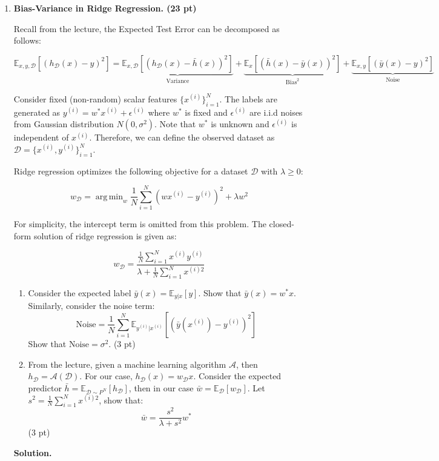 \documentclass{article}
\DeclareMathOperator*{\argmin}{arg\,min}
\theoremstyle{definition}
\theoremstyle{remark}
\newenvironment{Q}
    {%
      \clearpage
      \item
    }
    {%
      \phantom{s}
      \bigskip
      \textbf{Solution.}
    }
\begin{document}
\begin{enumerate}[font={\Large\bfseries},left=0pt]


\begin{Q}

\textbf{\Large Bias-Variance in Ridge Regression. (23 pt)}

Recall from the lecture, the Expected Test Error can be decomposed as follows:

$$
\mathbb{E}_{x, y, \mathcal{D}}[(h_{\mathcal{D}}(x) - y )^2] = \underbrace{\mathbb{E}_{x, \mathcal{D}}[(h_{\mathcal{D}}(x) - \bar{h}(x))^2]}_{\text{Variance}} + \underbrace{\mathbb{E}_{x}[(\bar{h}(x)-\bar{y}(x))^2]}_{\text{Bias}^2} + \underbrace{\mathbb{E}_{x, y}[(\bar{y}(x)-y)^2]}_{\text{Noise}}
$$

Consider fixed (non-random) scalar features $\{x^{(i)}\}_{i=1}^N$. The labels are generated as $y^{(i)}=w^* x^{(i)}+\epsilon^{(i)}$ where $w^{*}$ is fixed and $\epsilon^{(i)}$ are i.i.d noises from Gaussian distribution $N(0,\sigma^2)$. Note that $w^{*}$ is unknown and $\epsilon^{(i)}$ is independent of $x^{(i)}$. Therefore, we can define the observed dataset as $\mathcal{D} = \{x^{(i)}, y^{(i)}\}_{i=1}^N$.  

Ridge regression optimizes the following objective for a dataset $\mathcal{D}$ with $\lambda \geq 0$:

$$
w_{\mathcal{D}} = \argmin_w \frac{1}{N} \sum_{i=1}^N (wx^{(i)}-y^{(i)})^2 + \lambda w^2
$$

For simplicity, the intercept term is omitted from this problem. The closed-form solution of ridge regression is given as:

$$
w_{\mathcal{D}} = \frac{\frac{1}{N}\sum_{i=1}^N x^{(i)} y^{(i)}}{\lambda + \frac{1}{N} \sum_{i=1}^N x^{(i)2}}
$$

\begin{enumerate}
    \item Consider the expected label $\bar{{y}}(x) = \mathbb{E}_{y|x}[y]$. Show that $\bar{{y}}(x) = w^{*}x$. Similarly, consider the noise term: 
    $$
    \text{Noise} = \frac{1}{N} \sum_{i=1}^N \mathbb{E}_{y^{(i)}|x^{(i)}}[(\bar{y}(x^{(i)})-y^{(i)})^2]
    $$ 
    Show that $\text{Noise}=\sigma^2$. (3 pt)
    
    \item From the lecture, given a machine learning algorithm $\mathcal{A}$, then $h_{\mathcal{D}}=\mathcal{A}(\mathcal{D})$. For our case, $h_{\mathcal{D}}(x) = w_{\mathcal{D}}x$. Consider the expected predictor $\bar{h} = \mathbb{E}_{\mathcal{D}\sim P^{N}} \left[h_{\mathcal{D}}\right]$, then in our case $\bar{w} =  \mathbb{E}_{\mathcal{D}} [w_{\mathcal{D}}]$. Let $s^2 = \frac{1}{N}\sum_{i=1}^N x^{(i)2}$, show that:
    $$
    \bar{w} = \frac{s^2}{\lambda + s^2} w^{*}
    $$
    (3 pt)
    

\end{enumerate}
\end{Q}
\end{enumerate}
\end{document}
